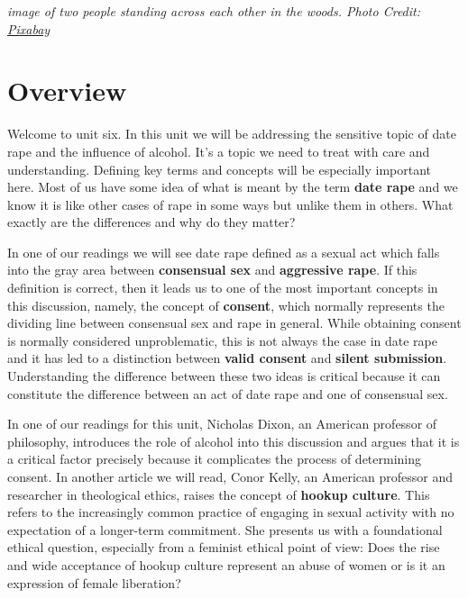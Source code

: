 \documentclass[
]{book}
\begin{document}
\emph{image of two people standing across each other in the woods. Photo Credit: \href{https://pixabay.com/en/portrait-anger-people-couple-119851/}{Pixabay}}

\hypertarget{overview-5}{%
\section*{Overview}\label{overview-5}}

Welcome to unit six. In this unit we will be addressing the sensitive topic of
date rape and the influence of alcohol. It's a topic we need to treat with care
and understanding. Defining key terms and concepts will be especially important
here.
Most of us have some idea of what is meant by the term \textbf{date rape} and we know it is like other cases of rape in some ways but unlike them in others. What exactly are the differences and why do they matter?

In one of our readings we will see date rape defined as a sexual act which falls into the gray area between \textbf{consensual sex} and \textbf{aggressive rape}. If this definition is correct, then it leads us to one of the most important concepts in this discussion, namely, the concept of \textbf{consent}, which normally represents the dividing line between consensual sex and rape in general.
While obtaining consent is normally considered unproblematic, this is not always the case in date rape and it has led to a distinction between \textbf{valid consent} and \textbf{silent submission}. Understanding the difference between these two ideas is critical because it can constitute the difference between an act of date rape and one of consensual sex.

In one of our readings for this unit, Nicholas Dixon, an American professor of philosophy, introduces the role of alcohol into this discussion and argues that it is a critical factor precisely because it complicates the process of determining consent.
In another article we will read, Conor Kelly, an American professor and researcher in theological ethics, raises the concept of \textbf{hookup culture}. This refers to the increasingly common practice of engaging in sexual activity with no expectation of a longer-term commitment. She presents us with a foundational ethical question, especially from a feminist ethical point of view: Does the rise and wide acceptance of hookup culture represent an abuse of women or is it an expression of female liberation?
\end{document}
